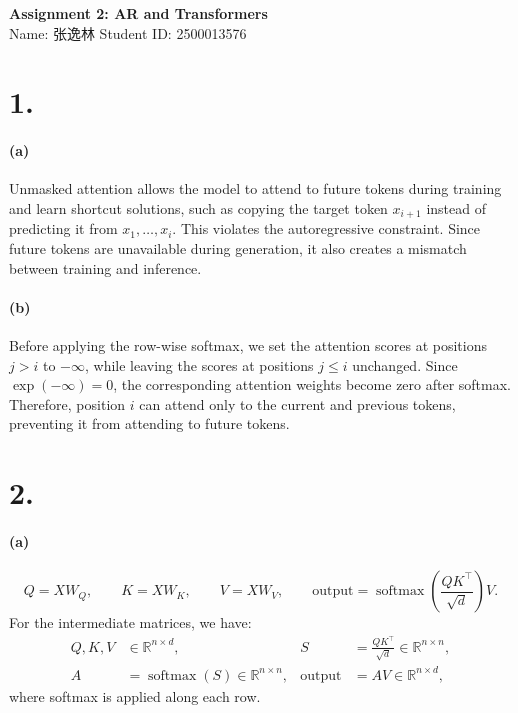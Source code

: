 \documentclass[11pt,a4paper]{article}
\DeclareMathOperator{\softmax}{softmax}
\newcommand{\R}{\mathbb{R}}
\begin{document}
\begin{center}
  {\Large\bfseries Assignment 2: AR and Transformers}\\[8pt]
  Name: 张逸林
  \hspace{8mm}
  Student ID: 2500013576
\end{center}

\section*{1.}

\paragraph{(a)}
Unmasked attention allows the model to attend to future tokens during
training and learn shortcut solutions, such as copying the target token
\(x_{i+1}\) instead of predicting it from \(x_1,\ldots,x_i\).
This violates the autoregressive constraint. Since future tokens are
unavailable during generation, it also creates a mismatch between training
and inference.

\paragraph{(b)}
Before applying the row-wise softmax, we set the attention scores at
positions \(j>i\) to \(-\infty\), while leaving the scores at positions
\(j\le i\) unchanged.
Since \(\exp(-\infty)=0\), the corresponding attention weights become zero
after softmax. Therefore, position \(i\) can attend only to the current and
previous tokens, preventing it from attending to future tokens.

\section*{2.}

\paragraph{(a)}
\[
Q=XW_Q,\qquad K=XW_K,\qquad V=XW_V,\qquad
\mathrm{output}=\softmax\!\left(\frac{QK^\top}{\sqrt d}\right)V.
\]
For the intermediate matrices, we have:
\[
\begin{aligned}
Q,K,V&\in\R^{n\times d},&
S&=\frac{QK^\top}{\sqrt d}\in\R^{n\times n},\\
A&=\softmax(S)\in\R^{n\times n},&
\mathrm{output}&=AV\in\R^{n\times d},
\end{aligned}
\]
where softmax is applied along each row.
\end{document}
